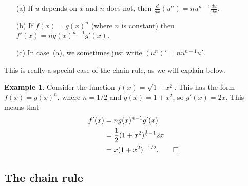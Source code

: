 \documentclass[a4paper]{book}
\renewcommand{\:}{\colon}
\theoremstyle{definition}
\newtheorem{example}[theorem]{Example}
\begin{document}
\begin{itemize}
 \item[(a)] If $u$ depends on $x$ and $n$ does not, then
  $\frac{d}{dx}(u^n)=nu^{n-1}\frac{du}{dx}$. 
 \item[(b)] If $f(x)=g(x)^n$ (where $n$ is constant) then
  $f'(x)=ng(x)^{n-1}g'(x)$.
 \item[(c)] In case~(a), we sometimes just write $(u^n)'=nu^{n-1}u'$. 
\end{itemize}
This is really a special case of the chain rule, as we will explain
below. 
\begin{example}
 Consider the function $f(x)=\sqrt{1+x^2}$.  This has the form
 $f(x)=g(x)^n$, where $n=1/2$ and $g(x)=1+x^2$, so $g'(x)=2x$.  This
 means that 
 \begin{align*}
  f'(x) &= n g(x)^{n-1} g'(x) \\
        &= \frac{1}{2} (1+x^2)^{\frac{1}{2}-1} 2x \\
        &= x (1+x^2)^{-1/2}. \qed
 \end{align*}
\end{example}

\subsection{The chain rule}
\label{subsec-rule-chain}
\end{document}
